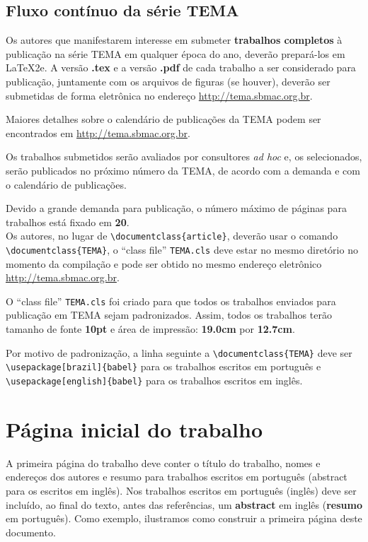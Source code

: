 \documentclass{TEMA}
\begin{document}
\subsection{Fluxo contínuo da série TEMA}

Os autores que manifestarem interesse em submeter {\bf trabalhos completos}
à publicação na série TEMA em qualquer época do ano, deverão
prepará-los em \LaTeX2e. A versão {\bf .tex} e a
versão {\bf .pdf} de cada trabalho a ser considerado para
publicação, juntamente com os arquivos de figuras (se houver),
deverão ser submetidas de forma eletrônica no endereço \url{http://tema.sbmac.org.br}.

Maiores detalhes sobre o calendário de publicações da TEMA podem ser encontrados em \url{http://tema.sbmac.org.br}.

Os trabalhos submetidos serão avaliados por consultores {\em ad
hoc} e, os selecionados, serão publicados no próximo número da
TEMA, de acordo com a demanda e com o calendário de publicações.

Devido a grande demanda para publicação, o número máximo de
páginas para trabalhos está fixado em {\bf 20}.\\

Os autores, no lugar de \verb!\documentclass{article}!, 
deverão usar o comando \verb!\documentclass{TEMA}!, o 
``class file'' \texttt{TEMA.cls} deve estar no mesmo 
diretório no momento da compilação e pode ser
obtido no mesmo endereço eletrônico  \newline 
\url{http://tema.sbmac.org.br}.

O ``class file'' \texttt{TEMA.cls} foi criado para que todos os
trabalhos enviados para publicação em TEMA sejam padronizados.
Assim, todos os trabalhos terão tamanho de fonte {\bf 10pt} e área
de impressão: {\bf 19.0cm} por {\bf 12.7cm}.

Por motivo de padronização, a linha seguinte a 
\verb!\documentclass{TEMA}! deve ser 
\verb!\usepackage[brazil]{babel}! para os trabalhos escritos em
português e \newline
\verb!\usepackage[english]{babel}! para os trabalhos escritos em inglês.


\section{Página inicial do trabalho}

A primeira página do trabalho deve conter o título do
trabalho, nomes e endereços dos autores e resumo para
trabalhos escritos em português (abstract para os
escritos em inglês). Nos trabalhos escritos em
português (inglês) deve ser incluído, ao final do texto, antes das
referências, um {\bf abstract} em inglês ({\bf resumo} em português).
Como exemplo, ilustramos como construir a primeira página
deste documento.
\end{document}
